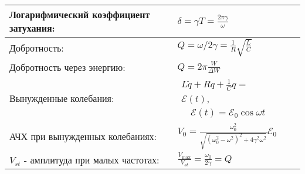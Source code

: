 \documentclass{article}
\begin{document}
\begin{tabular}{ |p{6cm}|p{3cm}|p{6cm}|p{3.5cm}|  }
                                                                           \\
\hline
Логарифмический коэффициент затухания:                                     &
$\delta=\gamma T=\frac{2 \pi \gamma}{\omega}$                              &
                                                                           &
                                                                           \\
\hline
Добротность:                                                               &
$Q=\omega / 2 \gamma = \frac{1}{R} \sqrt{\frac{L}{C}}$                     &
                                                                           &
                                                                           \\
\hline
Добротность через энергию:                                                 &
$Q=2 \pi \frac{W}{\Delta W}$                                               &
                                                                           &
                                                                           \\
\hline
Вынужденные колебания:                                                     &
$\begin{aligned}
L \ddot{q}+R \dot{q}+\frac{1}{C} q =                \\
\mathcal{E}(t),                                     \\
\quad \mathcal{E}(t)=\mathcal{E}_{0} \cos \omega t
\end{aligned}$                                                             &
                                                                           &
                                                                           \\
\hline
АЧХ при вынужденных колебаниях:                                            &
$V_{0}=\frac{\omega_{0}^{2}}{\sqrt{\left(\omega_{0}^{2}-\omega^{2}\right)^{2}+4 \gamma^{2} \omega^{2}}} \mathcal{E}_{0}$&
                                                                           &
                                                                           \\
\hline
$V_{st}$ - амплитуда при малых частотах:                                   &
$\frac{V_{\max }}{V_{st}}=\frac{\omega_{0}}{2 \gamma}=Q$                   &
                                                                           &
                                                                           \\

\end{tabular}
\end{document}
